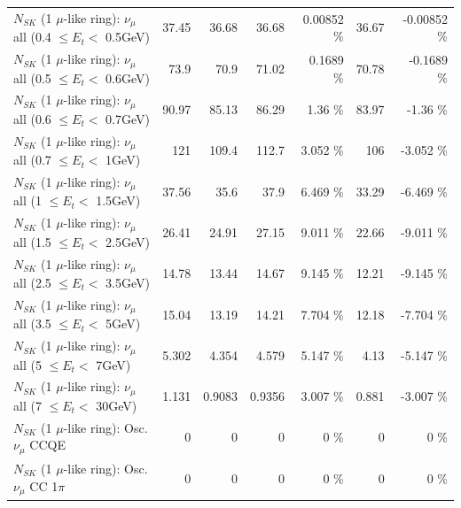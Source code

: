 \begin{table}
\begin{tabular}{| l | r | r | r  r | r  r |}
       $N_{SK}$ (1 $\mu$-like ring): $\nu_{\mu}$ all (0.4 $\leq E_{t} <$ 0.5GeV) &           37.45 &           36.68 &           36.68 &  0.00852 \%  &           36.67 & -0.00852 \%  \\ 
       $N_{SK}$ (1 $\mu$-like ring): $\nu_{\mu}$ all (0.5 $\leq E_{t} <$ 0.6GeV) &            73.9 &            70.9 &           71.02 &   0.1689 \%  &           70.78 &  -0.1689 \%  \\ 
       $N_{SK}$ (1 $\mu$-like ring): $\nu_{\mu}$ all (0.6 $\leq E_{t} <$ 0.7GeV) &           90.97 &           85.13 &           86.29 &     1.36 \%  &           83.97 &    -1.36 \%  \\ 
         $N_{SK}$ (1 $\mu$-like ring): $\nu_{\mu}$ all (0.7 $\leq E_{t} <$ 1GeV) &             121 &           109.4 &           112.7 &    3.052 \%  &             106 &   -3.052 \%  \\ 
         $N_{SK}$ (1 $\mu$-like ring): $\nu_{\mu}$ all (1 $\leq E_{t} <$ 1.5GeV) &           37.56 &            35.6 &            37.9 &    6.469 \%  &           33.29 &   -6.469 \%  \\ 
       $N_{SK}$ (1 $\mu$-like ring): $\nu_{\mu}$ all (1.5 $\leq E_{t} <$ 2.5GeV) &           26.41 &           24.91 &           27.15 &    9.011 \%  &           22.66 &   -9.011 \%  \\ 
       $N_{SK}$ (1 $\mu$-like ring): $\nu_{\mu}$ all (2.5 $\leq E_{t} <$ 3.5GeV) &           14.78 &           13.44 &           14.67 &    9.145 \%  &           12.21 &   -9.145 \%  \\ 
         $N_{SK}$ (1 $\mu$-like ring): $\nu_{\mu}$ all (3.5 $\leq E_{t} <$ 5GeV) &           15.04 &           13.19 &           14.21 &    7.704 \%  &           12.18 &   -7.704 \%  \\ 
           $N_{SK}$ (1 $\mu$-like ring): $\nu_{\mu}$ all (5 $\leq E_{t} <$ 7GeV) &           5.302 &           4.354 &           4.579 &    5.147 \%  &            4.13 &   -5.147 \%  \\ 
          $N_{SK}$ (1 $\mu$-like ring): $\nu_{\mu}$ all (7 $\leq E_{t} <$ 30GeV) &           1.131 &          0.9083 &          0.9356 &    3.007 \%  &           0.881 &   -3.007 \%  \\ 
\hline
\hline
                               $N_{SK}$ (1 $\mu$-like ring): Osc. $\nu_\mu$ CCQE &               0 &               0 &               0 &        0 \%  &               0 &        0 \%  \\ 
                          $N_{SK}$ (1 $\mu$-like ring): Osc. $\nu_\mu$ CC 1$\pi$ &               0 &               0 &               0 &        0 \%  &               0 &        0 \%  \\ 

\end{tabular}
\end{table}
